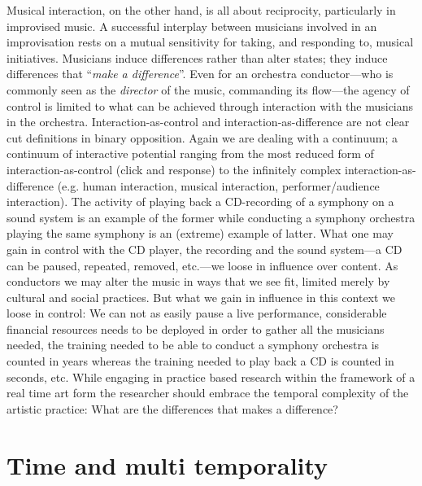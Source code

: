 Musical interaction, on the other hand, is all about reciprocity, particularly in improvised music. \parencite[See for example][]{monson96} A successful interplay between musicians involved in an improvisation rests on a mutual sensitivity for taking, and responding to, musical initiatives. Musicians induce differences rather than alter states; they induce differences that ``\emph{make a difference}''. \parencite[And, according to Gregory Bateson, a difference that makes a difference is the definition of \emph{Information}][92]{Bateson} Even for an orchestra conductor---who is commonly seen as the \emph{director} of the music, commanding its flow---the agency of control is limited to what can be achieved through interaction with the musicians in the orchestra. Interaction-as-control and interaction-as-difference are not clear cut definitions in binary opposition. Again we are dealing with a continuum; a continuum of interactive potential ranging from the most reduced form of interaction-as-control (click and response) to the infinitely complex interaction-as-difference (e.g. human interaction, musical interaction, performer/audience interaction). 
The activity of playing back a CD-recording of a symphony on a sound system is an example of the former while conducting a symphony orchestra playing the same symphony is an (extreme) example of latter. What one may gain in control with the CD player, the recording and the sound system---a CD can be paused, repeated, removed, etc.---we loose in influence over content. 
As conductors we may alter the music in ways that we see fit, limited merely by cultural and social practices. But what we gain in influence in this context we loose in control: We can not as easily pause a live performance, considerable financial resources needs to be deployed in order to gather all the musicians needed, the training needed to be able to conduct a symphony orchestra is counted in years whereas the training needed to play back a CD is counted in seconds, etc. While engaging in practice based research within the framework of a real time art form the researcher should embrace the temporal complexity of the artistic practice: What are the differences that makes a difference?

\section{Time and multi temporality}
\label{sec:performing-time}

